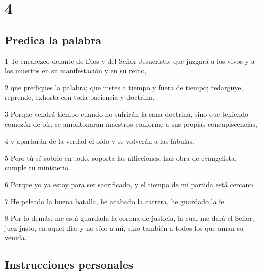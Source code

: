 \chapter{4}

\section*{Predica la palabra}

\par 1 Te encarezco delante de Dios y del Señor Jesucristo, que juzgará a los vivos y a los muertos en su manifestación y en su reino,
\par 2 que prediques la palabra; que instes a tiempo y fuera de tiempo; redarguye, reprende, exhorta con toda paciencia y doctrina.
\par 3 Porque vendrá tiempo cuando no sufrirán la sana doctrina, sino que teniendo comezón de oír, se amontonarán maestros conforme a sus propias concupiscencias,
\par 4 y apartarán de la verdad el oído y se volverán a las fábulas.
\par 5 Pero tú sé sobrio en todo, soporta las aflicciones, haz obra de evangelista, cumple tu ministerio.
\par 6 Porque yo ya estoy para ser sacrificado, y el tiempo de mi partida está cercano.
\par 7 He peleado la buena batalla, he acabado la carrera, he guardado la fe.
\par 8 Por lo demás, me está guardada la corona de justicia, la cual me dará el Señor, juez justo, en aquel día; y no sólo a mí, sino también a todos los que aman su venida.

\section*{Instrucciones personales}

